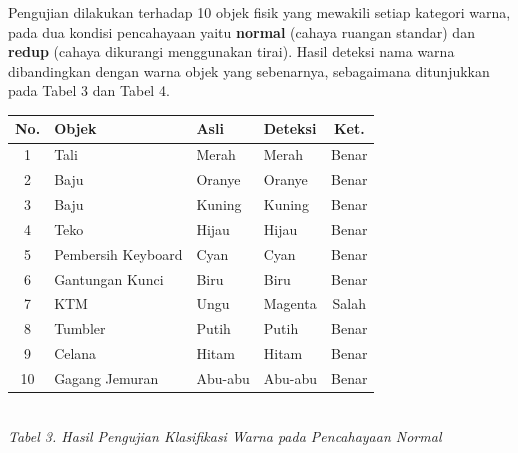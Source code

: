 Pengujian dilakukan terhadap 10 objek fisik yang mewakili setiap kategori warna, pada dua kondisi pencahayaan yaitu \textbf{normal} (cahaya ruangan standar) dan \textbf{redup} (cahaya dikurangi menggunakan tirai). Hasil deteksi nama warna dibandingkan dengan warna objek yang sebenarnya, sebagaimana ditunjukkan pada Tabel 3 dan Tabel 4.

\begin{table}[H]
  \centering
  {\scriptsize
  \begin{tabular}{|c|l|l|l|c|}
    \hline
    \textbf{No.} & \textbf{Objek} & \textbf{Asli} & \textbf{Deteksi} & \textbf{Ket.} \\
    \hline
    1 & Tali & Merah & Merah & Benar \\ \hline
    2 & Baju & Oranye & Oranye & Benar \\ \hline
    3 & Baju & Kuning & Kuning & Benar \\ \hline
    4 & Teko & Hijau & Hijau & Benar \\ \hline
    5 & Pembersih Keyboard & Cyan & Cyan & Benar \\ \hline
    6 & Gantungan Kunci & Biru & Biru & Benar \\ \hline
    7 & KTM & Ungu & Magenta & Salah \\ \hline
    8 & Tumbler & Putih & Putih & Benar \\ \hline
    9 & Celana & Hitam & Hitam & Benar \\ \hline
    10 & Gagang Jemuran & Abu-abu & Abu-abu & Benar \\ \hline
  \end{tabular}}\\[0.3em]
  {\footnotesize\textit{Tabel 3. Hasil Pengujian Klasifikasi Warna pada Pencahayaan Normal}}
\end{table}

